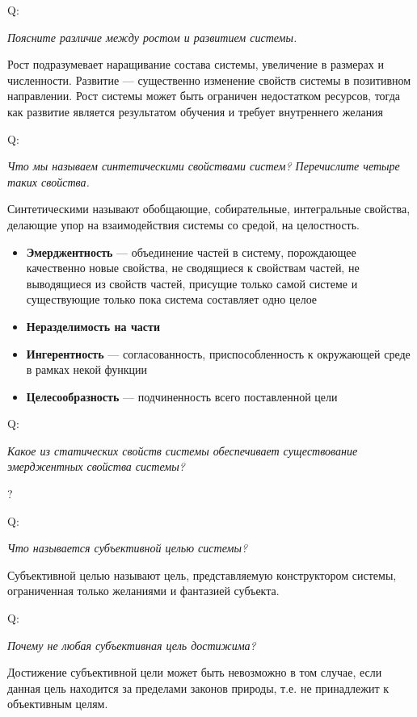 \documentclass{article}
\newcommand{\important}[1]{\textbf{#1}}
\newcommand{\define}[2]{
	\textbf{#1} --- #2
	}
\newcommand{\question}[2]{
	\begin{flushright}
		Q:\hspace{2ex}\vline\hspace{2ex}
		\begin{minipage}{0.9\textwidth}
			\large
			\textit{#1}
		\end{minipage}
	\end{flushright}
	\begin{center}
		\begin{minipage}{0.95\textwidth}
			#2
		\end{minipage}
	\end{center}
	}
\begin{document}
\question{Поясните различие между ростом и развитием системы.}{Рост подразумевает наращивание состава системы, увеличение в размерах и численности. Развитие --- существенно изменение свойств системы в позитивном направлении. Рост системы может быть ограничен недостатком ресурсов, тогда как развитие является результатом обучения и требует внутреннего желания}
\question{Что мы называем синтетическими свойствами систем? Перечислите четыре таких свойства.}{Синтетическими называют обобщающие, собирательные, интегральные свойства, делающие упор на взаимодействия системы со средой, на целостность.
	\begin{itemize}
	\item \define{Эмерджентность}{объединение частей в систему, порождающее качественно новые свойства, не сводящиеся к свойствам частей, не выводящиеся из свойств частей, присущие только самой системе и существующие только пока система составляет одно целое}
	\item \important{Неразделимость на части}
	\item \define{Ингерентность}{согласованность, приспособленность к окружающей среде в рамках некой функции}
	\item \define{Целесообразность}{подчиненность всего поставленной цели}
	\end{itemize}}
\question{Какое из статических свойств системы обеспечивает существование эмерджентных свойства системы?}{?}
\question{Что называется субъективной целью системы?}{Субъективной целью называют цель, представляемую конструктором системы, ограниченная только желаниями и фантазией субъекта.}
\question{Почему не любая субъективная цель достижима?}{Достижение субъективной цели может быть невозможно в том случае, если данная цель находится за пределами законов природы, т.е. не принадлежит к объективным целям.}
\end{document}
